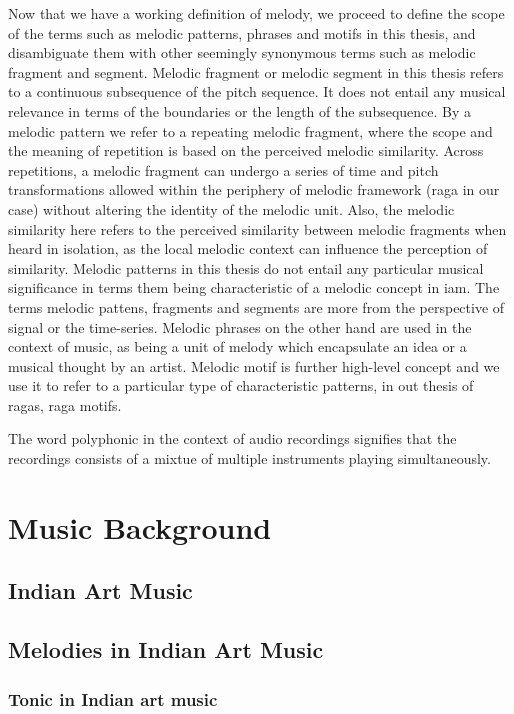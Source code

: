 Now that we have a working definition of melody, we proceed to define the scope of the terms such as melodic patterns, phrases and motifs in this thesis, and disambiguate them with other seemingly synonymous terms such as melodic fragment and segment. Melodic fragment or melodic segment in this thesis refers to a continuous subsequence of the pitch sequence. It does not entail any musical relevance in terms of the boundaries or the length of the subsequence. By a melodic pattern we refer to a repeating melodic fragment, where the scope and the meaning of repetition is based on the perceived melodic similarity. Across repetitions, a melodic fragment can undergo a series of time and pitch transformations allowed within the periphery of melodic framework (\gls{raga} in our case) without altering the identity of the melodic unit. Also, the melodic similarity here refers to the perceived similarity between melodic fragments when heard in isolation, as the local melodic context can influence the perception of similarity. Melodic patterns in this thesis do not entail any particular musical significance in terms them being characteristic of a melodic concept in \gls{iam}. The terms melodic pattens, fragments and segments are more from the perspective of signal or the time-series. Melodic phrases on the other hand are used in the context of music, as being a unit of melody which encapsulate an idea or a musical thought by an artist. Melodic motif is further high-level concept and we use it to refer to a particular type of characteristic patterns, in out thesis of \glspl{raga}, \gls{raga} motifs. 


The word polyphonic in the context of audio recordings signifies that the recordings consists of a mixtue of multiple instruments playing simultaneously.


\section{Music Background}
\label{sec:music_background}

\subsection{Indian Art Music}

\subsection{Melodies in Indian Art Music}

\subsubsection{Tonic in Indian art music}
\label{sec:background_tonic_in_iam}

